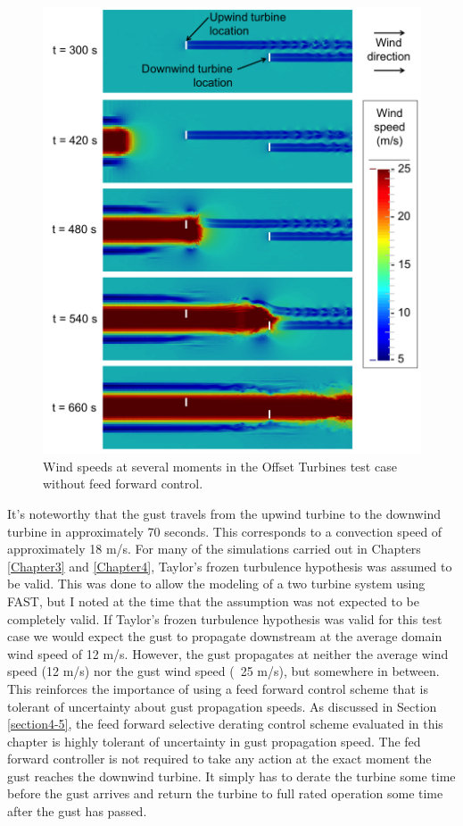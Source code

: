  
 \begin{figure}[hp]  
	\centering
		\includegraphics[width = \linewidth]{Figures/ch6Figures/fig6-14.png}

	\caption{Wind speeds at several moments in the Offset Turbines test case without feed forward control.}
	\label{fig6-14}
\end{figure}

It's noteworthy that the gust travels from the upwind turbine to the downwind turbine in approximately 70 seconds. This corresponds to a convection speed of approximately 18 m/s. For many of the simulations carried out in Chapters \ref{Chapter3} and \ref{Chapter4}, Taylor's frozen turbulence hypothesis was assumed to be valid. This was done to allow the modeling of a two turbine system using FAST, but I noted at the time that the assumption was not expected to be completely valid. If Taylor's frozen turbulence hypothesis was valid for this test case we would expect the gust to propagate downstream at the average domain wind speed of 12 m/s. However, the gust propagates at neither the average wind speed (12 m/s) nor the gust wind speed (~25 m/s), but somewhere in between. This reinforces the importance of using a feed forward control scheme that is tolerant of uncertainty about gust propagation speeds. As discussed in Section \ref{section4-5}, the feed forward selective derating control scheme evaluated in this chapter is highly tolerant of uncertainty in gust propagation speed. The fed forward controller is not required to take any action at the exact moment the gust reaches the downwind turbine. It simply has to derate the turbine some time before the gust arrives and return the turbine to full rated operation some time after the gust has passed.

